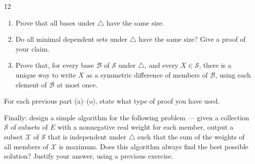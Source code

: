 \documentclass[11pt]{article}
\begin{document}
\begin{exercise}{12}
\begin{enumerate}[label=(\alph*)]
            $\mathcal{S}$ and $\mathcal{T}$ are independent under
            $\triangle$ and $|\mathcal{T}| = |\mathcal{S}|+1$, then
            there exists $X \in \mathcal{T}\setminus\mathcal{S}$ such
            that $\mathcal{S}\cup\{X\}$ is independent under
            $\triangle$.
        \item Prove that all bases under $\triangle$ have the same
            size.
        \item Do all minimal dependent sets under $\triangle$ have the
            same size? Give a proof of your claim.
        \item Prove that, for every base $\mathcal{B}$ of $\mathcal{S}$
            under $\triangle$, and every $X \in \mathcal{S}$, there is
            a unique way to write $X$ as a symmetric difference of
            members of $\mathcal{B}$, using each element of
            $\mathcal{B}$ at most once.
    \end{enumerate}
    For each previous part (a)--(o), state what type of proof you have
    used.

    Finally: design a simple algorithm for the following problem ---
    given a collection $\mathcal{S}$ of subsets of $E$ with a
    nonnegative real weight for each member, output a subset
    $\mathcal{X}$ of $\mathcal{S}$ that is independent under
    $\triangle$ such that the sum of the weights of all members of
    $\mathcal{X}$ is maximum. Does this algorithm always find the best
    possible solution? Justify your answer, using a previous exercise.
\end{exercise}
\begin{solution}[(a)]

\end{solution}
\begin{solution}[(b)]

\end{solution}
\begin{solution}[(c)]

\end{solution}
\begin{solution}[(d)]

\end{solution}
\begin{solution}[(e)]

\end{solution}
\begin{solution}[(f)]

\end{solution}
\begin{solution}[(g)]

\end{solution}
\end{document}
